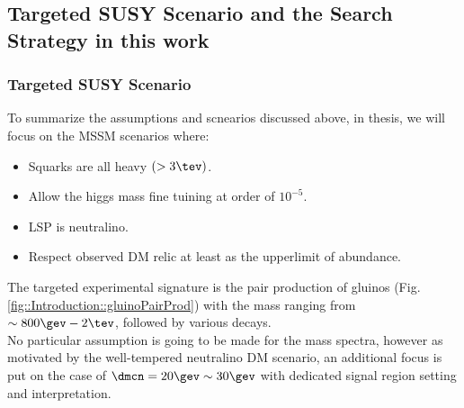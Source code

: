 





\subsection{Targeted SUSY Scenario and the Search Strategy in this work} 
\subsubsection{Targeted SUSY Scenario }
To summarize the assumptions and scnearios discussed above, in thesis, we will focus on the MSSM scenarios where:
\begin{itemize}
 \item Squarks are all heavy $(>3\tev)$.
 \item Allow the higgs mass fine tuining at order of $10^{-5}$.
 \item LSP is neutralino.
 \item Respect observed DM relic at least as the upperlimit of abundance.
\end{itemize}

The targeted experimental signature is the pair production of gluinos (Fig. \ref{fig::Introduction::gluinoPairProd}) with the mass ranging from $\sim 800\gev-2\tev$, followed by various decays. \\
No particular assumption is going to be made for the mass spectra, however as motivated by the well-tempered neutralino DM scenario, an additional focus is put on the case of $\dmcn = 20\gev \sim 30\gev$ with dedicated signal region setting and interpretation.


